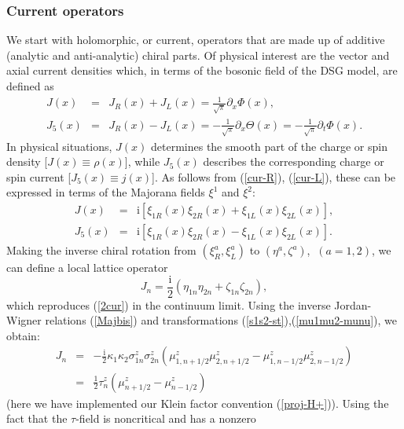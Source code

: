 \subsubsection{Current operators}

We start with holomorphic, or current, operators that are made up of additive
(analytic and anti-analytic) chiral parts. Of physical interest are
the vector and axial current densities which, in terms of the bosonic field
of the DSG model, are defined as
\begin{eqnarray}
J(x) &=& J_R (x) + J_L (x) = \frac{1}{\sqrt{\pi}} \partial_x \Phi (x), \label{1cur}\\
J_5 (x) &=& J_R (x) - J_L (x) = - \frac{1}{\sqrt{\pi}} \partial_x \Theta (x)
= - \frac{1}{\sqrt{\pi}} \partial_t \Phi(x) .
\label{1cur5}
\end{eqnarray}
In physical situations, $J(x)$ determines the smooth part of the charge or
spin density [$J(x) \equiv \rho (x)$], while $J_5 (x)$ describes the
corresponding charge or spin current [$J_5 (x) \equiv j(x)$].
As follows from (\ref{cur-R}), (\ref{cur-L}), these can be expressed in
terms of the Majorana fields $\xi^1$ and $\xi^2$:
\begin{eqnarray}
J(x) &=& \mbox{i} \left[ \xi_{1R}(x) \xi_{2R}(x)  + \xi_{1L} (x)\xi_{2L}(x) \right], \label{2cur}\\
J_5 (x) &=& \mbox{i} \left[ \xi_{1R}(x) \xi_{2R}(x)  - \xi_{1L} (x)\xi_{2L}(x) \right]. \label{2cur5}
\end{eqnarray}
Making the inverse chiral rotation from $(\xi^a _R, \xi^a _L)$ to
$(\eta^a,\zeta^a)$, $~(a=1,2)$,
we can define a local lattice operator
\begin{equation}
J_n = \frac{\mbox{i}}{2} \left( \eta_{1n} \eta_{2n} + \zeta_{1n} \zeta_{2n}
\right),
\end{equation}
which reproduces (\ref{2cur}) in the continuum limit.
Using the inverse Jordan-Wigner relations (\ref{Majbis}) and transformations
(\ref{s1s2-st}),(\ref{mu1mu2-munu}), we obtain:
\begin{eqnarray}
J_n &=& - \frac{\mbox{i}}{2} \kappa_1 \kappa_2 \sigma^z _{1n}\sigma^z _{2n}
\left( \mu^z _{1,n+1/2} \mu^z _{2,n+1/2} - 
\mu^z _{1,n-1/2} \mu^z _{2,n-1/2}\right) \nonumber\\
&=& \frac{1}{2} \tau^z _{n}
\left( \mu^z _{n+1/2} - \mu^z _{n-1/2} \right)
\label{rho_n-via-s-tau}
\end{eqnarray}
(here we have implemented our Klein factor convention (\ref{proj-H+})).
Using the fact that the $\tau$-field is noncritical and has a nonzero
